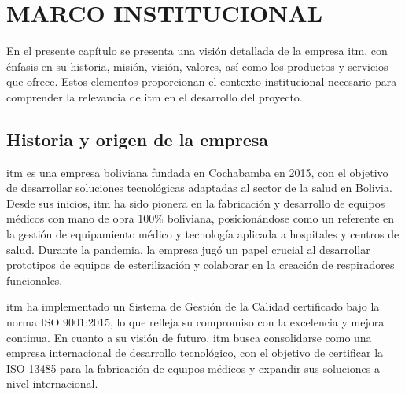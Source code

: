 
\newpage

%
%

\section{MARCO INSTITUCIONAL}
En el presente capítulo se presenta una visión detallada de la empresa \acrlong{itm}, con énfasis en su historia, misión, visión, valores, así como los productos y servicios que ofrece. Estos elementos proporcionan el contexto institucional necesario para comprender la relevancia de \acrshort{itm} en el desarrollo del proyecto.

\subsection{Historia y origen de la empresa}

\acrshort{itm} es una empresa boliviana fundada en Cochabamba en 2015, con el objetivo de desarrollar soluciones tecnológicas adaptadas al sector de la salud en Bolivia. Desde sus inicios, \acrshort{itm} ha sido pionera en la fabricación y desarrollo de equipos médicos con mano de obra 100\% boliviana, posicionándose como un referente en la gestión de equipamiento médico y tecnología aplicada a hospitales y centros de salud. Durante la pandemia, la empresa jugó un papel crucial al desarrollar prototipos de equipos de esterilización y colaborar en la creación de respiradores funcionales.

\acrshort{itm} ha implementado un Sistema de Gestión de la Calidad certificado bajo la norma ISO 9001:2015, lo que refleja su compromiso con la excelencia y mejora continua. En cuanto a su visión de futuro, \acrshort{itm} busca consolidarse como una empresa internacional de desarrollo tecnológico, con el objetivo de certificar la ISO 13485 para la fabricación de equipos médicos y expandir sus soluciones a nivel internacional.

